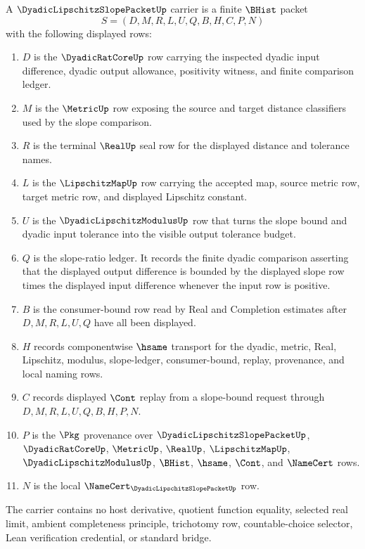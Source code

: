 \begin{definition}
\label{def:dyadic-lipschitz-slope-packet-carrier}
A $\DyadicLipschitzSlopePacketUp$ carrier is a finite $\BHist$ packet
$$
S=(D,M,R,L,U,Q,B,H,C,P,N)
$$
with the following displayed rows:
\begin{enumerate}
\item $D$ is the $\DyadicRatCoreUp$ row carrying the inspected dyadic input difference, dyadic output allowance, positivity witness, and finite comparison ledger.
\item $M$ is the $\MetricUp$ row exposing the source and target distance classifiers used by the slope comparison.
\item $R$ is the terminal $\RealUp$ seal row for the displayed distance and tolerance names.
\item $L$ is the $\LipschitzMapUp$ row carrying the accepted map, source metric row, target metric row, and displayed Lipschitz constant.
\item $U$ is the $\DyadicLipschitzModulusUp$ row that turns the slope bound and dyadic input tolerance into the visible output tolerance budget.
\item $Q$ is the slope-ratio ledger. It records the finite dyadic comparison asserting that the displayed output difference is bounded by the displayed slope row times the displayed input difference whenever the input row is positive.
\item $B$ is the consumer-bound row read by Real and Completion estimates after $D,M,R,L,U,Q$ have all been displayed.
\item $H$ records componentwise $\hsame$ transport for the dyadic, metric, Real, Lipschitz, modulus, slope-ledger, consumer-bound, replay, provenance, and local naming rows.
\item $C$ records displayed $\Cont$ replay from a slope-bound request through $D,M,R,L,U,Q,B,H,P,N$.
\item $P$ is the $\Pkg$ provenance over $\DyadicLipschitzSlopePacketUp$, $\DyadicRatCoreUp$, $\MetricUp$, $\RealUp$, $\LipschitzMapUp$, $\DyadicLipschitzModulusUp$, $\BHist$, $\hsame$, $\Cont$, and $\NameCert$ rows.
\item $N$ is the local $\NameCert_{\DyadicLipschitzSlopePacketUp}$ row.
\end{enumerate}
The carrier contains no host derivative, quotient function equality, selected real limit, ambient completeness principle, trichotomy row, countable-choice selector, Lean verification credential, or standard bridge.
\end{definition}

